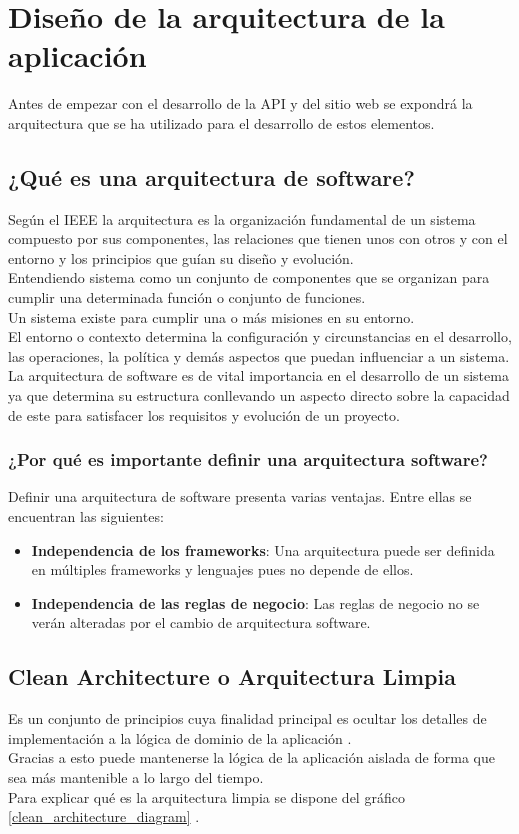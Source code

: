 \section{Diseño de la arquitectura de la aplicación}
Antes de empezar con el desarrollo de la API y del sitio web se expondrá la arquitectura que se ha utilizado para el desarrollo de estos elementos.

\subsection{¿Qué es una arquitectura de software?}
Según el IEEE \cite{ieee-software-architecture} la arquitectura es la organización fundamental de un sistema compuesto por sus componentes, las relaciones que tienen unos con otros y con el entorno y los principios que guían su diseño y evolución.
\\Entendiendo sistema como un conjunto de componentes que se organizan para cumplir una determinada función o conjunto de funciones.
\\Un sistema existe para cumplir una o más misiones en su entorno.
\\El entorno o contexto determina la configuración y circunstancias en el desarrollo, las operaciones, la política y demás aspectos que puedan influenciar a un sistema.
\\La arquitectura de software es de vital importancia en el desarrollo de un sistema ya que determina su estructura conllevando un aspecto directo sobre la capacidad de este para satisfacer los requisitos y evolución de un proyecto.

\subsubsection{¿Por qué es importante definir una arquitectura software?}
Definir una arquitectura de software presenta varias ventajas. Entre ellas se encuentran las siguientes:
\begin{itemize}
    \item \textbf{Independencia de los frameworks}: Una arquitectura puede ser definida en múltiples frameworks y lenguajes pues no depende de ellos.
    \item \textbf{Independencia de las reglas de negocio}: Las reglas de negocio no se verán alteradas por el cambio de arquitectura software.
\end{itemize}


\subsection{Clean Architecture o Arquitectura Limpia}
Es un conjunto de principios cuya finalidad principal es ocultar los detalles de implementación a la lógica de dominio de la aplicación \cite{clean-architecture}.
\\Gracias a esto puede mantenerse la lógica de la aplicación aislada de forma que sea más mantenible a lo largo del tiempo.
\\Para explicar qué es la arquitectura limpia se dispone del gráfico \ref{clean_architecture_diagram} \cite{clean-architecture-book}.

